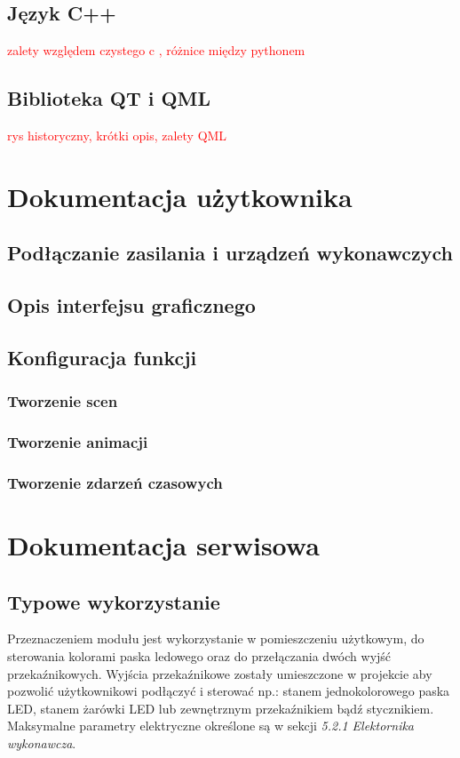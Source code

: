 \documentclass[12pt, eng, twoside, openany, final]{mgr}
\begin{document}
    \section{Język C++}
   \textcolor{red}{zalety względem czystego c , różnice między pythonem}
    \section{Biblioteka QT i QML}
    \textcolor{red}{rys historyczny, krótki opis, zalety QML}

%
\chapter{Dokumentacja użytkownika}
\thispagestyle{fancy}
    \section{Podłączanie zasilania i urządzeń wykonawczych}
    \section{Opis interfejsu graficznego}
    \section{Konfiguracja funkcji}
        \subsection{Tworzenie scen}
        \subsection{Tworzenie animacji}
        \subsection{Tworzenie zdarzeń czasowych}
%
\chapter{Dokumentacja serwisowa}
\thispagestyle{fancy}
    \section{Typowe wykorzystanie}
    Przeznaczeniem modułu jest wykorzystanie w pomieszczeniu użytkowym, do sterowania kolorami paska ledowego oraz do przełączania dwóch wyjść przekaźnikowych. Wyjścia przekaźnikowe zostały umieszczone w projekcie aby pozwolić użytkownikowi podłączyć i sterować np.: stanem jednokolorowego paska LED, stanem żarówki LED lub zewnętrznym przekaźnikiem bądź stycznikiem. Maksymalne parametry elektryczne określone są w sekcji \emph{5.2.1 Elektornika wykonawcza}.
    \newpage
    
\end{document}
